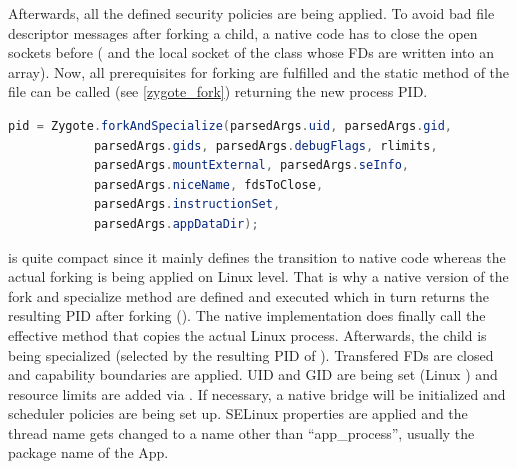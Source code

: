 Afterwards, all the defined security policies are being applied. To avoid bad file
descriptor messages after forking a child, a native code has to close the open sockets before ( and the local socket  of the
 class whose FDs are written into an 
array).
Now, all prerequisites for forking are fulfilled and the static method
 of the  file can be called
(see \autoref{zygote_fork}) returning the new process PID.\newpage
\begin{lstlisting}[language=Java, caption=Zygote Fork Call, label=zygote_fork]
pid = Zygote.forkAndSpecialize(parsedArgs.uid, parsedArgs.gid,
            parsedArgs.gids, parsedArgs.debugFlags, rlimits,
            parsedArgs.mountExternal, parsedArgs.seInfo,
            parsedArgs.niceName, fdsToClose,
            parsedArgs.instructionSet,
            parsedArgs.appDataDir);
\end{lstlisting}
 is quite compact since it mainly defines the transition
to native code whereas the actual forking is being applied on Linux level. That is why
a native version of the fork and specialize method are defined and executed
which in turn returns the resulting PID after forking
().
The native implementation does finally call the effective  method
that copies the actual Linux process. Afterwards, the child is being
specialized (selected by the resulting PID of ).
Transfered FDs are closed and capability boundaries are applied.
UID and GID are being set (Linux ) and resource limits are added via .
If necessary, a native bridge will be initialized and scheduler policies
are being set up. SELinux properties are applied and the thread name gets
changed to a name other than ``app\_process'', usually the package name of the App.

